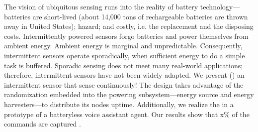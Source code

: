 The vision of ubiquitous sensing runs into the reality of battery technology---batteries are short-lived (about 14,000 tons of rechargeable batteries are thrown away in United States); hazard; and costly, i.e. the replacement and the disposing costs. Intermittently powered sensors forgo batteries and power themselves from ambient energy. Ambient energy is marginal and unpredictable. Consequently, intermittent sensors operate sporadically, when sufficient energy to do a simple task is buffered. Sporadic sensing does not meet many real-world applications; therefore, intermittent sensors have not been widely adapted. We present \textit{\fullsys} (\sys) an intermittent sensor that sense continuously! The \sys design takes advantage of the randomization embedded into the powering subsystem---energy source and energy harvesters---to distribute its nodes uptime. Additionally, we realize the \sys in a prototype of a batteryless voice assistant agent. Our results show that x\% of the commands are captured .
%
%
%
%
